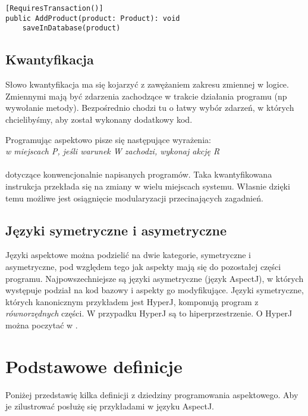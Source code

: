 \documentclass[a4paper,12pt]{mwbk}
\begin{document}
\begin{lstlisting}[style=AspectJ,caption=Oznaczenie atrybutem,label=atrybut]
[RequiresTransaction()]
public AddProduct(product: Product): void
    saveInDatabase(product)
\end{lstlisting}

\subsection{Kwantyfikacja}
		
Słowo kwantyfikacja ma się kojarzyć z zawężaniem zakresu zmiennej w logice.
Zmiennymi mają być zdarzenia zachodzące w trakcie działania programu (np
wywołanie metody).  Bezpośrednio chodzi tu o łatwy wybór zdarzeń, w których
chcielibyśmy, aby został wykonany dodatkowy kod.
             
Programując aspektowo pisze się następujące wyrażenia: \\

{\it w miejscach P, jeśli warunek W zachodzi, wykonaj akcję R } \\
\\
dotyczące konwencjonalnie napisanych programów. Taka kwantyfikowana instrukcja
przekłada się na zmiany w wielu miejscach systemu. Własnie dzięki temu możliwe
jest osiągnięcie modularyzacji przecinających zagadnień.

\subsection{Języki symetryczne i asymetryczne} \label{symiasym} 

Języki aspektowe można podzielić na dwie kategorie, symetryczne i asymetryczne,
pod względem tego jak aspekty mają się do pozostałej części programu.
Najpowszechniejsze są języki asymetryczne (język AspectJ), w których występuje
podział na kod bazowy i aspekty go modyfikujące. Języki symetryczne, których
kanonicznym przykładem jest HyperJ, komponują program z \emph{równorzędnych}
części. W przypadku HyperJ są to hiperprzestrzenie.  O HyperJ można poczytać w
\cite{MultiDim,WieloWym}.
         
\section{Podstawowe definicje}

Poniżej przedstawię kilka definicji z dziedziny programowania aspektowego.
Aby je zilustrować posłużę się przykładami w języku AspectJ. 
\end{document}
